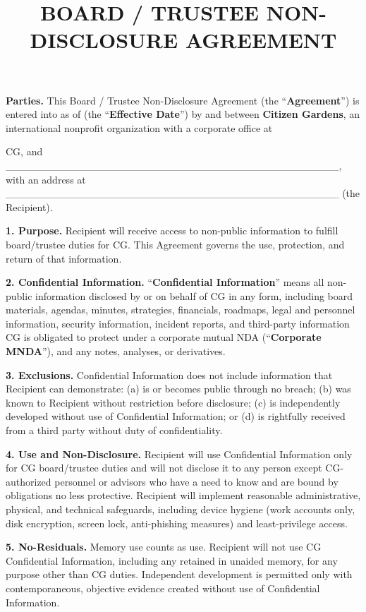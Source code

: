 \documentclass[11pt]{article}
\title{\large\bfseries BOARD / TRUSTEE NON-DISCLOSURE AGREEMENT}
\date{} %
\begin{document}
\maketitle

\textbf{Parties.} This Board / Trustee Non-Disclosure Agreement (the ``\textbf{Agreement}'') is entered into as of (the ``\textbf{Effective Date}'') by and between \textbf{Citizen Gardens}, an international nonprofit organization with a corporate office at \address{189 Private Dr. 123, Crown City, Ohio 45632} CG, and _____________________________________________, with an address at _____________________________________________ (the Recipient).

\textbf{1. Purpose.} Recipient will receive access to non-public information to fulfill board/trustee duties for CG. This Agreement governs the use, protection, and return of that information.

\textbf{2. Confidential Information.} ``\textbf{Confidential Information}'' means all non-public information disclosed by or on behalf of CG in any form, including board materials, agendas, minutes, strategies, financials, roadmaps, legal and personnel information, security information, incident reports, and third-party information CG is obligated to protect under a corporate mutual NDA (``\textbf{Corporate MNDA}''), and any notes, analyses, or derivatives.

\textbf{3. Exclusions.} Confidential Information does not include information that Recipient can demonstrate: (a) is or becomes public through no breach; (b) was known to Recipient without restriction before disclosure; (c) is independently developed without use of Confidential Information; or (d) is rightfully received from a third party without duty of confidentiality.

\textbf{4. Use and Non-Disclosure.} Recipient will use Confidential Information only for CG board/trustee duties and will not disclose it to any person except CG-authorized personnel or advisors who have a need to know and are bound by obligations no less protective. Recipient will implement reasonable administrative, physical, and technical safeguards, including device hygiene (work accounts only, disk encryption, screen lock, anti-phishing measures) and least-privilege access.

\textbf{5. No-Residuals.} Memory use counts as use. Recipient will not use CG Confidential Information, including any retained in unaided memory, for any purpose other than CG duties. Independent development is permitted only with contemporaneous, objective evidence created without use of Confidential Information.
\end{document}
